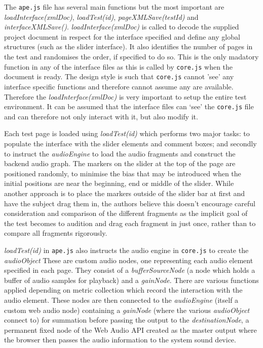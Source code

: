 \documentclass{article}
\begin{document}
The \texttt{ape.js} file has several main functions but the most important are \textit{loadInterface(xmlDoc)}, \textit{loadTest(id)}, \textit{pageXMLSave(testId)} and \textit{interfaceXMLSave()}. \textit{loadInterface(xmlDoc)} is called to decode the supplied project document in respect for the interface specified and define any global structures (such as the slider interface). It also identifies the number of pages in the test and randomises the order, if specified to do so. This is the only madatory function in any of the interface files as this is called by \texttt{core.js} when the document is ready. The design style is such that \texttt{core.js} cannot 'see' any interface specific functions and therefore cannot assume any are available. Therefore the \textit{loadInterface(xmlDoc)} is very important to setup the entire test environment. It can be assumed that the interface files can `see' the \texttt{core.js} file and can therefore not only interact with it, but also modify it.

Each test page is loaded using \textit{loadTest(id)} which performs two major tasks: to populate the interface with the slider elements and comment boxes; and secondly to instruct the \textit{audioEngine} to load the audio fragments and construct the backend audio graph. The markers on the slider at the top of the page are positioned randomly, to minimise the bias that may be introduced when the initial positions are near the beginning, end or middle of the slider. While another approach is to place the markers outside of the slider bar at first and have the subject drag them in, the authors believe this doesn't encourage careful consideration and comparison of the different fragments as the implicit goal of the test becomes to audition and drag each fragment in just once, rather than to compare all fragments rigorously.

\textit{loadTest(id)} in \texttt{ape.js} also instructs the audio engine in \texttt{core.js} to create the \textit{audioObject} These are custom audio nodes, one representing each audio element specified in each page.
They consist of a \textit{bufferSourceNode} (a node which holds a buffer of audio samples for playback) and a \textit{gainNode}. There are various functions applied depending on metric collection which record the interaction with the audio element. These nodes are then connected to the \textit{audioEngine} (itself a custom web audio node) containing a \textit{gainNode} (where the various \textit{audioObject} connect to) for summation before passing the output to the \textit{destinationNode}, a permanent fixed node of the Web Audio API created as the master output where the browser then passes the audio information to the system sound device. %
\end{document}
